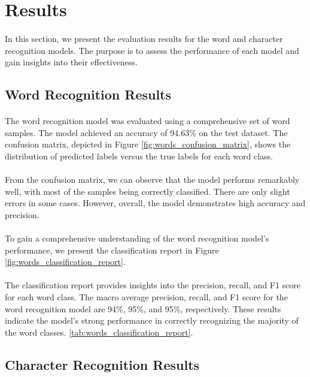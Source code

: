 \section{Results}
\paragraph{}
In this section, we present the evaluation results for the word and character recognition models. The purpose is to assess the performance of each model and gain insights into their effectiveness.
\subsection{Word Recognition Results}
\paragraph{}
The word recognition model was evaluated using a comprehensive set of word samples. The model achieved an accuracy of 94.63\% on the test dataset. The confusion matrix, depicted in Figure \ref{fig:words_confusion_matrix}, shows the distribution of predicted labels versus the true labels for each word class.
\paragraph{}
From the confusion matrix, we can observe that the model performs remarkably well, with most of the samples being correctly classified. There are only slight errors in some cases. However, overall, the model demonstrates high accuracy and precision.
\paragraph{}
To gain a comprehensive understanding of the word recognition model's performance, we present the classification report in Figure \ref{fig:words_classification_report}.
\paragraph{}
The classification report provides insights into the precision, recall, and F1 score for each word class. The macro average precision, recall, and F1 score for the word recognition model are 94\%, 95\%, and 95\%, respectively. These results indicate the model's strong performance in correctly recognizing the majority of the word classes.
 \ref{tab:words_classification_report}.
\subsection{Character Recognition Results}
